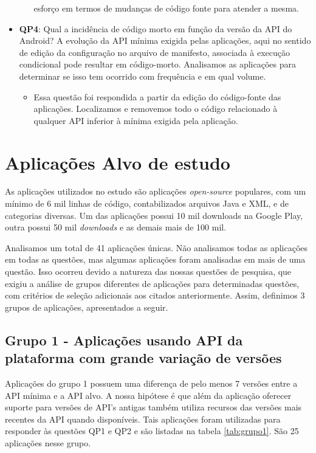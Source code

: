 \begin{itemize}
\begin{itemize}
			esforço em termos de mudanças de código fonte para atender a mesma.
		\end{itemize}
	\item \textbf{QP4}: Qual a incidência de código morto em função da versão da API do Android? 
	A evolução da API mínima exigida pelas aplicações, aqui no sentido de edição da configuração
	no arquivo de manifesto, associada à execução condicional pode resultar em código-morto.
	Analisamos as aplicações para determinar se isso tem ocorrido com frequência e em qual volume.
		\begin{itemize}
			\item Essa questão foi respondida a partir da edição do código-fonte das aplicações.
			Localizamos e removemos todo o código relacionado à qualquer API inferior à mínima
			exigida pela aplicação.
		\end{itemize}
\end{itemize}

\section{Aplicações Alvo de estudo} \label{sec:aplicacoes-alvo}

As aplicações utilizados no estudo são aplicações \textit{open-source} populares,
com um mínimo de 6 mil linhas de código, contabilizados arquivos Java e XML, e de
categorias diversas. Um das aplicações possui 10 mil downloads na Google Play,
outra possui 50 mil \textit{downloads} e as demais mais de 100 mil.

Analisamos um total de 41 aplicações únicas. Não analisamos todas as aplicações em
todas as questões, mas algumas aplicações foram analisadas em mais de uma questão.
Isso ocorreu devido a natureza das nossas questões de pesquisa, que exigiu a análise
de grupos diferentes de aplicações para determinadas questões, com critérios de seleção
adicionais aos citados anteriormente. Assim, definimos 3 grupos de aplicações, apresentados
a seguir.

\subsection{Grupo 1 - Aplicações usando API da plataforma com grande variação de versões}
Aplicações do grupo 1 possuem uma diferença de pelo menos 7 versões entre a API mínima e
a API alvo. A nossa hipótese é que além da aplicação oferecer suporte para versões de API's
antigas também utiliza recursos das versões mais recentes da API quando disponíveis. Tais
aplicações foram utilizadas para responder às questões QP1 e QP2 e são listadas na tabela
\ref{tab:grupo1}. São 25 aplicações nesse grupo.

